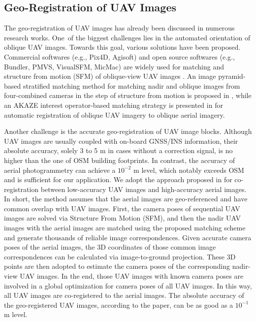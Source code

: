 \subsection{Geo-Registration of UAV Images}
The geo-registration of UAV images has already been discussed in numerous research works. One~of the biggest challenges lies in the automated orientation of oblique UAV images. Towards this goal, various solutions have been proposed. Commercial softwares (e.g., Pix4D, Agisoft) and open source softwares (e.g., Bundler,  PMVS,  VisualSFM,  MicMac) are widely used for matching and structure from motion (SFM) of oblique-view UAV images \cite{lingua20173d,aicardi2016UAV}. An image pyramid-based stratified matching method for matching nadir and oblique images from four-combined cameras in the step of structure from motion is proposed in \cite{xie2012study}, while an AKAZE 
interest operator-based matching strategy is presented in \cite{onyango2017accurate} for automatic registration of oblique UAV imagery to oblique aerial imagery.

Another challenge is the accurate geo-registration of UAV image blocks. Although UAV images are usually coupled with on-board GNSS/INS information, their absolute
accuracy, solely 3 to 5 m in cases without a correction signal, is no higher than the one of OSM building footprints. In contrast, the accuracy of aerial photogrammetry can achieve a $10^{-2}$ m level, which notably exceeds OSM and is sufficient for our application. We adopt the approach proposed in \cite{zhuo2017automatic} for co-registration between low-accuracy UAV images and high-accuracy aerial images. In short, the method assumes that the aerial images are geo-referenced and have common overlap with UAV images. First, the camera poses of sequential UAV images are solved via Structure From Motion (SFM), and then the nadir UAV images with the aerial images are matched using the proposed matching scheme and generate thousands of reliable image correspondences. Given accurate camera poses of the aerial images, the 3D coordinates of those common image correspondences can be calculated via image-to-ground projection. These 3D points are then adopted to estimate the camera poses of the corresponding nadir-view UAV images. In the end, those UAV images with known camera poses are involved in a global optimization for camera poses of all UAV images. In this way, all UAV images are co-registered to the aerial images. The absolute accuracy of the geo-registered UAV images, according to the paper, can be as good as a $10^{-1}$ m level.

